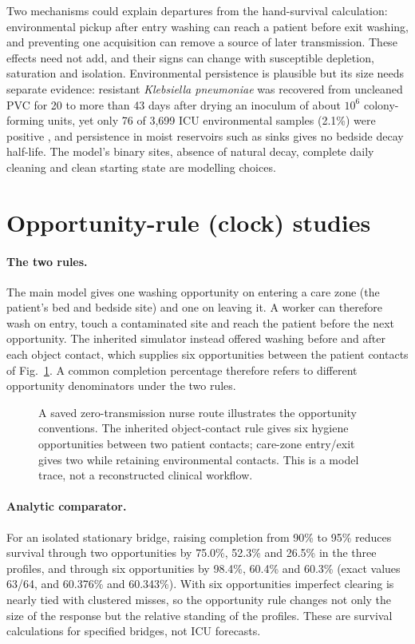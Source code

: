 \documentclass[11pt]{article}
\begin{document}
Two mechanisms could explain departures from the hand-survival calculation:
environmental pickup after entry washing can reach a patient before exit washing,
and preventing one acquisition can remove a source of later transmission. These
effects need not add, and their signs can change with susceptible depletion,
saturation and isolation. Environmental persistence is plausible but its size
needs separate evidence: resistant \emph{Klebsiella pneumoniae} was
recovered from uncleaned PVC for 20 to more than 43 days after drying an inoculum
of about $10^6$ colony-forming units, yet only 76 of 3,699 ICU environmental
samples (2.1\%) were positive \citep{wei2021}, and persistence
in moist reservoirs such as sinks \citep{degeyter2017} gives no bedside decay
half-life. The model's binary sites, absence of natural decay, complete daily
cleaning and clean starting state are modelling choices.

\section{Opportunity-rule (clock) studies}\label{sec:s-clock}
\paragraph{The two rules.} The main model gives one washing opportunity on
entering a care zone (the patient's bed and bedside site) and one on leaving it.
A worker can therefore wash on entry, touch a contaminated site and reach the
patient before the next opportunity. The inherited simulator instead offered
washing before and after each object contact, which supplies six opportunities
between the patient contacts of Fig.~\ref{fig:clock}. A common completion
percentage therefore refers to different opportunity denominators under the two
rules.

\begin{figure}[htbp]\centering

\caption{A saved zero-transmission nurse route illustrates the opportunity conventions. The inherited object-contact rule gives six hygiene opportunities between two patient contacts; care-zone entry/exit gives two while retaining environmental contacts. This is a model trace, not a reconstructed clinical workflow.}\label{fig:clock}
\end{figure}

\paragraph{Analytic comparator.} For an isolated stationary bridge, raising
completion from 90\% to 95\% reduces survival through two opportunities by
75.0\%, 52.3\% and 26.5\% in the three profiles, and through six opportunities by
98.4\%, 60.4\% and 60.3\% (exact values 63/64, and 60.376\% and 60.343\%). With
six opportunities imperfect clearing is nearly tied with clustered misses, so
the opportunity rule changes not only the size of the response but the relative
standing of the profiles. These are survival calculations for specified
bridges, not ICU forecasts.
\end{document}
